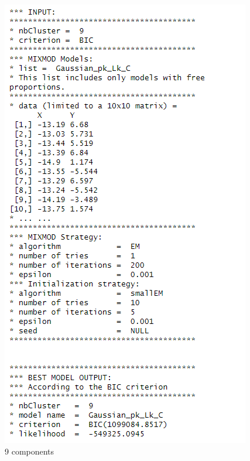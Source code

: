 \documentclass[11pt,a4paper,]{article}
\begin{document}
\begin{figure}

{\centering \includegraphics[width=1\linewidth]{image/clust9} 

}

\caption{9 components}\label{fig:clustnie}
\end{figure}
\end{document}
